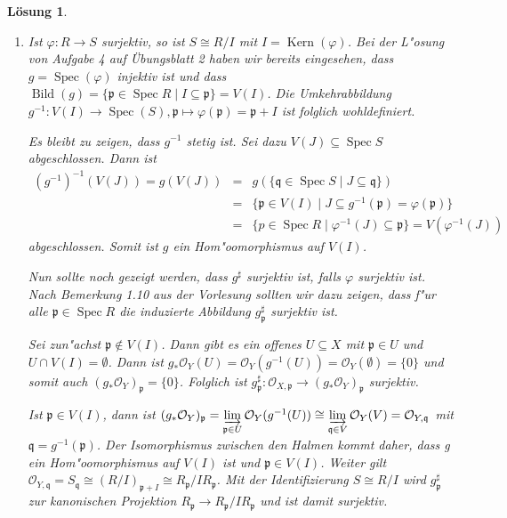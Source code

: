 \documentclass[paper = A4, fontsize=12pt, numbers=noendperiod, chapterprefix=true]{scrbook}
\theoremstyle{break}
\newtheorem{Loes}{L\"osung}
\theoremstyle{nonumberbreak}
\theoremstyle{nonumberplain}
\DeclareMathOperator{\Bild}{Bild}
\DeclareMathOperator{\Kern}{Kern}
\DeclareMathOperator{\Spec}{Spec}
\newcommand{\p}{\mathfrak{p}} %
\newcommand{\q}{\mathfrak{q}} %
\begin{document}
\begin{Loes}
\begin{enumerate}%
  \item[c)] Ist $\varphi\colon R \to S$ surjektiv, so ist $S \cong R/I$ mit $I = \Kern(\varphi)$. Bei der L"osung von Aufgabe 4 auf \"Ubungsblatt 2 haben wir bereits eingesehen, dass $g = \Spec(\varphi)$ injektiv ist und dass $\Bild(g) = \{ \p \in \Spec R \mid I \subseteq \p \} = V(I)$. Die Umkehrabbildung $g^{-1} \colon V(I) \to \Spec(S), \p \mapsto \varphi(\p) = \p + I$ ist folglich wohldefiniert.
  
  Es bleibt zu zeigen, dass $g^{-1}$ stetig ist. Sei dazu $V(J) \subseteq \Spec S$ abgeschlossen. Dann ist 
  $$ \begin{array}{rcl}
        (g^{-1})^{-1}(V(J))
  = g(V(J))
  &=& g(\{\q \in \Spec S \mid J \subseteq \q \})\\
  &=& \{ \p \in V(I) \mid J \subseteq g^{-1}(\p) = \varphi(\p)\}\\
  &=& \{p \in \Spec R \mid \varphi^{-1}(J) \subseteq \p \} = V(\varphi^{-1}(J))
     \end{array}
  $$
  abgeschlossen.
  Somit ist $g$ ein Hom"oomorphismus auf $V(I)$.
  
  Nun sollte noch gezeigt werden, dass $g^\sharp$ surjektiv ist, falls $\varphi$ surjektiv ist. Nach Bemerkung 1.10 aus der Vorlesung sollten wir dazu zeigen, dass f"ur alle $\p \in \Spec R$ die induzierte Abbildung $g^\sharp_{\p}$ surjektiv ist.
  
  Sei zun"achst $\p \notin V(I)$. Dann gibt es ein offenes $U \subseteq X$ mit $\p \in U$ und $U \cap V(I)= \emptyset$. Dann ist $g_\ast \mathcal{O}_Y(U) = \mathcal{O}_Y(g^{-1}(U)) = \mathcal{O}_Y(\emptyset) = \{0\}$ und somit auch $(g_\ast \mathcal{O}_Y)_{\p} = \{0\}$. Folglich ist $g_{\p}^\sharp\colon \mathcal{O}_{X,\p} \to (g_\ast\mathcal{O}_Y)_{\p}$ surjektiv. 
  
  Ist $\p \in V(I)$, dann ist $(g_\ast \mathcal{O}_Y)_{\p} = \varinjlim\limits_{\p \in U} \mathcal{O}_Y(g^{-1}(U)) \cong \varinjlim\limits_{\q \in V} \mathcal{O}_Y(V) = \mathcal{O}_{Y,\q}$ mit $\q = g^{-1}(\p)$. Der Isomorphismus zwischen den Halmen kommt daher, dass g ein Hom"oomorphismus auf $V(I)$ ist und $\p \in V(I)$.
  Weiter gilt $\mathcal{O}_{Y,\q} = S_{\q} \cong (R/I)_{\p+I} \cong R_{\p}/I  R_{\p}$. Mit der Identifizierung $S \cong R/I$ wird $g^\sharp_{\p}$ zur kanonischen Projektion $R_{\p} \to R_{\p}/I R_{\p}$ und ist damit surjektiv.
\end{enumerate}
\end{Loes}
\end{document}
